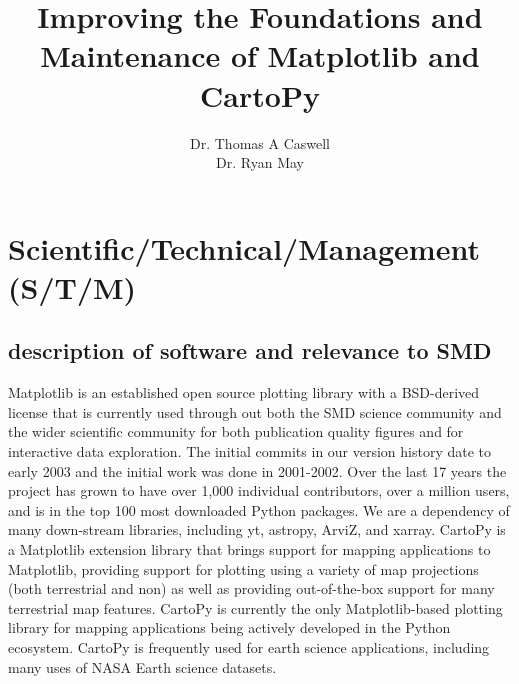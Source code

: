\documentclass[12pt]{article}
\numberwithin{page}{section}
\begin{document}
\title{Improving the Foundations and Maintenance of Matplotlib and CartoPy}
\author{Dr. Thomas A Caswell\\Dr. Ryan May}
\date{}
\maketitle

\setcounter{tocdepth}{2}
\tableofcontents

\thispagestyle{empty}



\newpage
\section{Scientific/Technical/Management (S/T/M)}
\setcounter{page}{1}
\subsection{description of software and relevance to SMD}
Matplotlib is an established open source plotting library with a
BSD-derived license that is currently used through out both the SMD
science community and the wider scientific community for both
publication quality figures and for interactive data exploration.  The
initial commits in our version history date to early 2003 and the
initial work was done in 2001-2002. Over the last 17 years the project
has grown to have over 1,000 individual contributors, over a million
users, and is in the top 100 most downloaded Python packages. We are a
dependency of many down-stream libraries, including yt, astropy,
ArviZ, and xarray. CartoPy is a Matplotlib extension library that
brings support for mapping applications to Matplotlib, providing
support for plotting using a variety of map projections (both
terrestrial and non) as well as providing out-of-the-box support for
many terrestrial map features. CartoPy is currently the only
Matplotlib-based plotting library for mapping applications being
actively developed in the Python ecosystem. CartoPy is frequently used
for earth science applications, including many uses of NASA Earth
science datasets.
\end{document}
